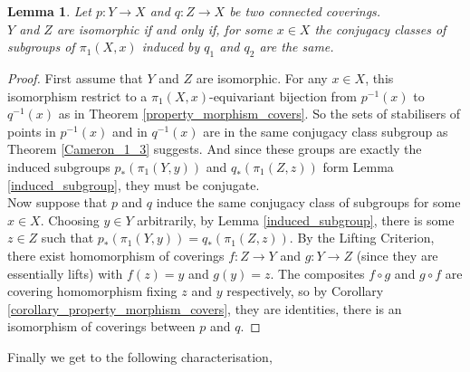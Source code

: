 \documentclass{article}
\theoremstyle{plain}
\newtheorem{lemma}[theorem]{Lemma}
\theoremstyle{definition}
\begin{document}
\begin{lemma}
\label{isomorphism_conjugate}
    Let $p:Y\rightarrow X$ and $q:Z\rightarrow X$ be two connected coverings.\\
    $Y$ and $Z$ are isomorphic if and only if, for some $x\in X$ the conjugacy classes of subgroups of $\pi_1(X,x)$ induced by $q_1$ and $q_2$ are the same.
\end{lemma}
\begin{proof}
    First assume that $Y$ and $Z$ are isomorphic. 
    For any $x\in X$, this isomorphism restrict to a $\pi_1(X,x)$-equivariant bijection from $p^{-1}(x)$ to $q^{-1}(x)$ as in Theorem \ref{property_morphism_covers}. 
    So the sets of stabilisers of points in $p^{-1}(x)$ and in $q^{-1}(x)$ are in the same conjugacy class subgroup as Theorem \ref{Cameron_1_3} suggests. 
    And since these groups are exactly the induced subgroups $p_*(\pi_1(Y,y))$ and $q_*(\pi_1(Z,z))$ form Lemma \ref{induced_subgroup}, they must be conjugate.\\
    Now suppose that $p$ and $q$ induce the same conjugacy class of subgroups for some $x\in X$. 
    Choosing $y\in Y$ arbitrarily, by Lemma \ref{induced_subgroup}, there is some $z\in Z$ such that $p_*(\pi_1(Y,y)) = q_*(\pi_1(Z,z))$.
    By the Lifting Criterion, there exist  homomorphism of coverings $f : Z \rightarrow Y$ and $g: Y\rightarrow Z$ (since they are essentially lifts) with $f(z) = y$ and $g(y)=z$. 
    The composites $f\circ g$ and $g\circ f$ are covering homomorphism fixing $z$ and $y$ respectively, so by Corollary \ref{corollary_property_morphism_covers}, they are identities, there is an isomorphism of coverings between $p$ and $q$.
\end{proof}

\noindent Finally we get to the following characterisation,
\end{document}

